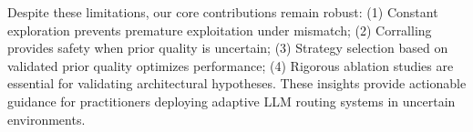 Despite these limitations, our core contributions remain robust:
(1) Constant exploration prevents premature exploitation under mismatch;
(2) Corralling provides safety when prior quality is uncertain;
(3) Strategy selection based on validated prior quality optimizes performance;
(4) Rigorous ablation studies are essential for validating architectural hypotheses.
These insights provide actionable guidance for practitioners deploying adaptive LLM routing systems in uncertain environments.
